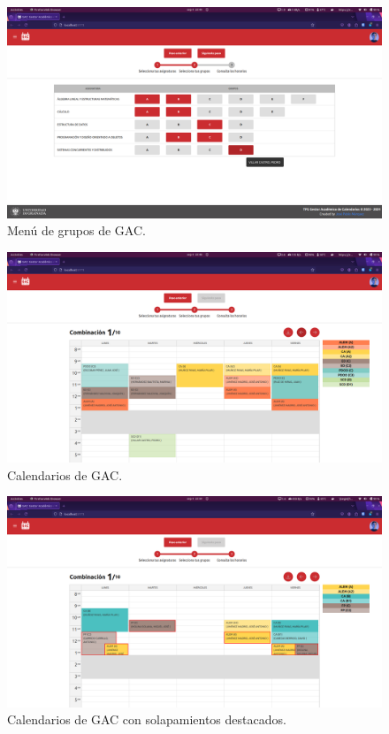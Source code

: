 \begin{figure}[H]
    \centering
    \includegraphics[width=1\textwidth]{imagenes/GAC_grupos.png}
    \caption{Menú de grupos de GAC.}
    \label{fig:GAC_grupos}
\end{figure}

\begin{figure}[H]
    \centering
    \includegraphics[width=1\textwidth]{imagenes/GAC_calendarios.png}
    \caption{Calendarios de GAC.}
    \label{fig:GAC_calendario}
\end{figure}
\vspace{3cm}
\begin{figure}[H]
    \centering
    \includegraphics[width=1\textwidth]{imagenes/GAC_solapamientos.png}
    \caption{Calendarios de GAC con solapamientos destacados.}
    \label{fig:GAC_calendario_solapamientos}
\end{figure}

